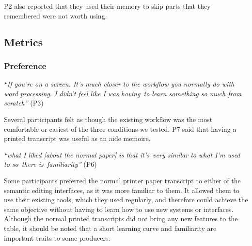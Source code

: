 P2 also reported that they used their memory to skip parts that they remembered were not worth using.

\subsection{Metrics}

\subsubsection{Preference}

\textit{``If you're on a screen. It's much closer to the workflow you normally do with word processing. I didn't feel
like I was having to learn something so much from scratch''} (P3)

Several participants felt as though the existing workflow was the most comfortable or easiest of the three conditions
we tested. P7 said that having a printed transcript was useful as an aide memoire.

\textit{``what I liked [about the normal paper] is that it's very similar to what I'm used to so there is familiarity''}
(P6)

Some participants preferred the normal printer paper transcript to either of the semantic editing interfaces, as it was
more familiar to them. It allowed them to use their existing tools, which they used regularly, and therefore could
achieve the same objective without having to learn how to use new systems or interfaces. Although the normal printed
transcripts did not bring any new features to the table, it should be noted that a short learning curve and familiarity
are important traits to some producers.

